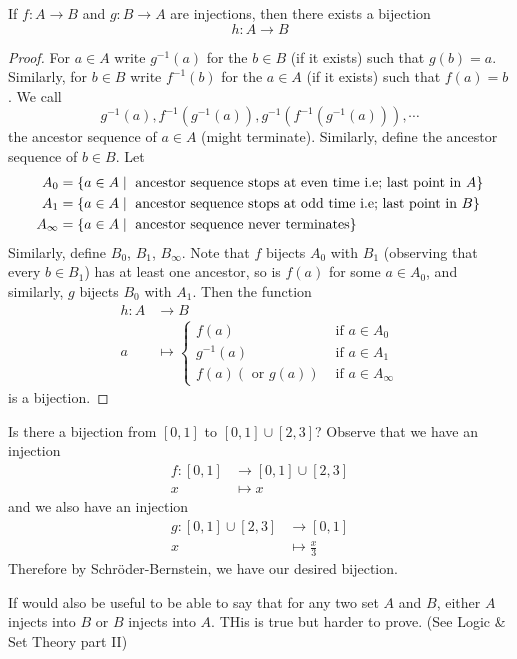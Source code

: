 \documentclass{article}
\begin{document}
\begin{nthm}\label{th:5-13}
    If $f: A \rightarrow B$ and $g: B \rightarrow A$ are injections, then there exists a bijection
    \[
        h: A \rightarrow B  
    \]
\end{nthm}
\begin{proof}
    For $a \in A$ write $g^{-1}(a)$ for the $b \in B$ (if it exists) such that $g(b) = a$.
    Similarly, for $b \in B$ write $f^{-1}(b)$ for the $a \in A$ (if it exists) such that $f(a) = b$.
    We call 
    \[
        g^{-1}(a), f^{-1}(g^{-1}(a)), g^{-1}(f^{-1}(g^{-1}(a))), \cdots
    \]
    the ancestor sequence of $a \in A$ (might terminate).
    Similarly, define the ancestor sequence of $b \in B$.
    Let
    \begin{align*}
        A_0 &= \left\{ a \in A \mid \text{ ancestor sequence stops at even time i.e; last point in } A \right\} \\
        A_1 &= \left\{ a \in A \mid \text{ ancestor sequence stops at odd time i.e; last point in } B \right\} \\
        A_\infty &= \left\{ a \in A \mid \text{ ancestor sequence never terminates} \right\}
    \end{align*}
    Similarly, define $B_0$, $B_1$, $B_\infty$.
    Note that $f$ bijects $A_0$ with $B_1$ (observing that every $b \in B_1$) has at least one ancestor, so is $f(a)$ for some $a \in A_0$,
    and similarly, $g$ bijects $B_0$ with $A_1$.
    Then the function
    \begin{align*}
        h: A &\rightarrow B \\
        a &\mapsto \begin{cases}
            f(a) & \text{ if } a \in A_0 \\
            g^{-1}(a) & \text{ if } a \in A_1 \\
            f(a) (\text{ or } g(a)) & \text{ if } a \in A_\infty
        \end{cases}
    \end{align*}
    is a bijection.
\end{proof}

\begin{eg}
    Is there a bijection from $[0, 1]$ to $[0, 1] \cup [2, 3]$?
    Observe that we have an injection 
    \begin{align*}
        f: [0, 1] &\rightarrow [0, 1] \cup [2, 3] \\
        x &\mapsto x
    \end{align*}
    and we also have an injection
    \begin{align*}
        g: [0, 1] \cup [2, 3] &\rightarrow [0, 1] \\
        x &\mapsto \frac{x}{3}
    \end{align*}
    Therefore by Schr\"oder-Bernstein, we have our desired bijection.
\end{eg}
\begin{remark}
    If would also be useful to be able to say that for any two set $A$ and $B$, either $A$ injects into $B$ or $B$ injects into $A$.
    THis is true but harder to prove. (See Logic \& Set Theory part II)
\end{remark}
\end{document}

